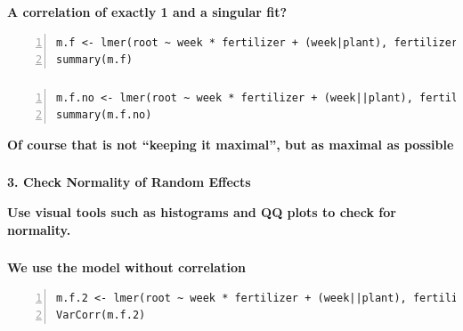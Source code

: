 \documentclass{beamer}
\begin{document}
\begin{frame}[fragile]
    \frametitle{}
    \textbf{A correlation of exactly 1 and a singular fit?}
    \tiny
    \begin{Verbatim}[numbers=left,numbersep=6pt,frame=single]
m.f <- lmer(root ~ week * fertilizer + (week|plant), fertilizer)
summary(m.f)        
    \end{Verbatim}
    \scalebox{1}{
        
    }
\end{frame}

\begin{frame}[fragile]
    \frametitle{}
    \tiny
    \begin{Verbatim}[numbers=left,numbersep=6pt,frame=single]
m.f.no <- lmer(root ~ week * fertilizer + (week||plant), fertilizer)
summary(m.f.no) 
    \end{Verbatim}
    \scalebox{1}{
        
    }
    \vspace{}
    
    \normalsize
    \textbf{Of course that is not “keeping it maximal”, but as maximal as possible}
\end{frame}

\begin{frame}
    \frametitle{}
    \huge\color{purple}\textbf{3. Check Normality of Random Effects}
    \vspace{0.5cm}
    
    \normalsize\color{black}\textbf{Use visual tools such as histograms and QQ plots to check for normality.}
\end{frame}

\begin{frame}[fragile]
    \frametitle{}
    \textbf{We use the model without correlation}
    \vspace{0.5cm}
    
    \scriptsize
    \begin{Verbatim}[numbers=left,numbersep=6pt,frame=single]
m.f.2 <- lmer(root ~ week * fertilizer + (week||plant), fertilizer)
VarCorr(m.f.2)         
    \end{Verbatim}
    \scalebox{1}{
        
    }
\end{frame}
\end{document}
